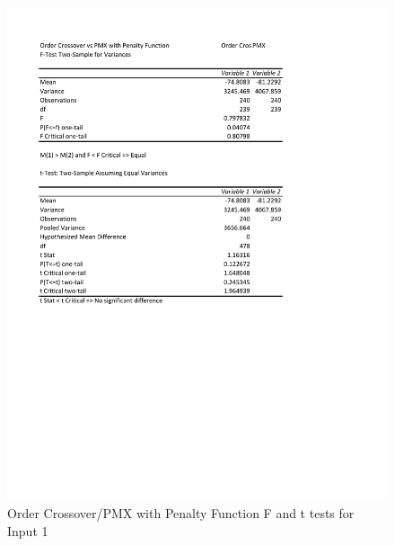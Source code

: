 \documentclass[times]{article}
\begin{document}
	\begin{figure}
		\caption{Order Crossover/PMX with Penalty Function F and t tests for Input 1}
		\label{fig:order_pmx_penalty1}
		\includegraphics[width=\textwidth]{./t_test/order_pmx_penalty1}
	\end{figure}
\end{document}
